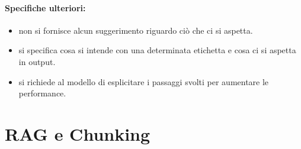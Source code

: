 
\paragraph{Specifiche ulteriori:}

\begin{itemize}
  \item {} non si fornisce alcun suggerimento riguardo ciò che ci si aspetta. 
  \item {} si specifica cosa si intende con una determinata etichetta e cosa ci si aspetta in output. 
  \item {} si richiede al modello di esplicitare i passaggi svolti per aumentare le performance.
\end{itemize}

\section{RAG e Chunking}






